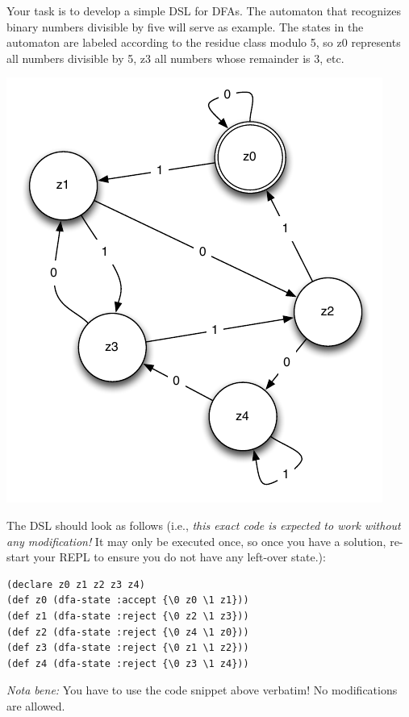 \documentclass[11pt,a4paper]{article}
\begin{document}
\begin{exercise}[DFA]
Your task is to develop a simple DSL for DFAs.
The automaton that recognizes binary numbers divisible by five will serve as example.
The states in the automaton are labeled according to the residue class modulo 5,
so z0 represents all numbers divisible by 5, z3 all numbers whose remainder is 3, etc.

\begin{minipage}{.4\textwidth}
\includegraphics[scale=0.5]{dfa.png} 
\end{minipage}%
\begin{minipage}{.6\textwidth}
    The DSL should look as follows (i.e., \emph{this exact code is expected to work without any modification!} 
    It may only be executed once, so once you have a solution, re-start your REPL to ensure you do not have any left-over state.):

\begin{verbatim}
(declare z0 z1 z2 z3 z4)
(def z0 (dfa-state :accept {\0 z0 \1 z1}))
(def z1 (dfa-state :reject {\0 z2 \1 z3}))
(def z2 (dfa-state :reject {\0 z4 \1 z0}))
(def z3 (dfa-state :reject {\0 z1 \1 z2}))
(def z4 (dfa-state :reject {\0 z3 \1 z4}))
\end{verbatim}

\emph{Nota bene:} You have to use the code snippet above verbatim! No modifications are allowed.


\end{minipage}
\end{exercise}
\end{document}
